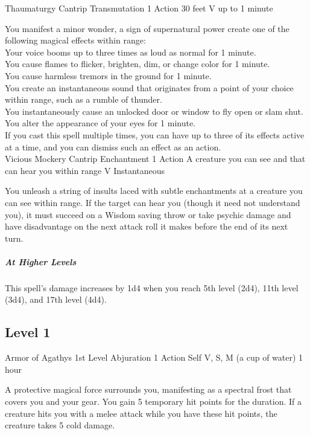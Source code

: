 \documentclass[letterpaper,openany,oneside,twocolumn]{book}
\begin{document}
\DndSpellHeader
  {Thaumaturgy}
  {Cantrip Transmutation}
  {1 Action}
  {30 feet}
  {V}
  {up to 1 minute}

You manifest a minor wonder, a sign of supernatural power create one of the following magical effects within range:\\
Your voice booms up to three times as loud as normal for 1 minute.\\
You cause flames to flicker, brighten, dim, or change color for 1 minute.\\
You cause harmless tremors in the ground for 1 minute.\\
You create an instantaneous sound that originates from a point of your choice within range, such as a rumble of thunder.\\
You instantaneously cause an unlocked door or window to fly open or slam shut.\\
You alter the appearance of your eyes for 1 minute.\\
If you cast this spell multiple times, you can have up to three of its effects active at a time, and you can dismiss such an effect as an action.\\

\DndSpellHeader
  {Vicious Mockery}
  {Cantrip Enchantment}
  {1 Action}
  {A creature you can see and that can hear you within range}
  {V}
  {Instantaneous}

You unleash a string of insults laced with subtle enchantments at a creature you can see within range. If the target can hear you (though it need not understand you), it must succeed on a Wisdom saving throw or take  psychic damage and have disadvantage on the next attack roll it makes before the end of its next turn.

\subparagraph*{At Higher Levels} This spell's damage increases by 1d4 when you reach 5th level (2d4), 11th level (3d4), and 17th level (4d4).

\subsection*{Level 1}

\DndSpellHeader
  {Armor of Agathys}
  {1st Level Abjuration}
  {1 Action}
  {Self}
  {V, S, M (a cup of water)}
  {1 hour}
  
A protective magical force surrounds you, manifesting as a spectral frost that covers you and your gear. You gain 5 temporary hit points for the duration. If a creature hits you with a melee attack while you have these hit points, the creature takes 5 cold damage.
\end{document}
